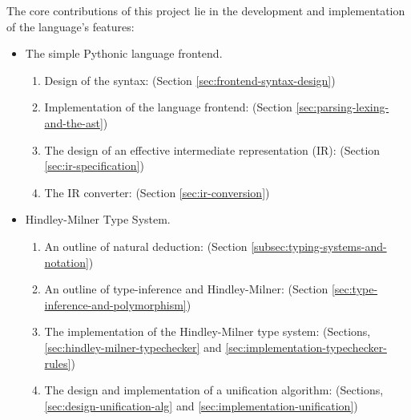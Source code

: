 \documentclass{l4proj}
\begin{document}
The core contributions of this project lie in the development and implementation of the language’s features:

\begin{itemize}
    \item The simple Pythonic language frontend.
    \begin{enumerate}
        \item Design of the syntax: (Section \ref{sec:frontend-syntax-design})
        \item Implementation of the language frontend: (Section \ref{sec:parsing-lexing-and-the-ast})
        \item The design of an effective intermediate representation (IR): (Section \ref{sec:ir-specification})
        \item The IR converter: (Section \ref{sec:ir-conversion})
    \end{enumerate}
    \item Hindley-Milner Type System.
    \begin{enumerate}
        \item An outline of natural deduction: (Section \ref{subsec:typing-systems-and-notation})
        \item An outline of type-inference and Hindley-Milner: (Section \ref{sec:type-inference-and-polymorphism})
        \item The implementation of the Hindley-Milner type system: (Sections, \ref{sec:hindley-milner-typechecker} and \ref{sec:implementation-typechecker-rules})
        \item The design and implementation of a unification algorithm\citep{Robinson_1965}: (Sections, \ref{sec:design-unification-alg} and \ref{sec:implementation-unification})
    \end{enumerate}
\end{itemize}





\end{document}
